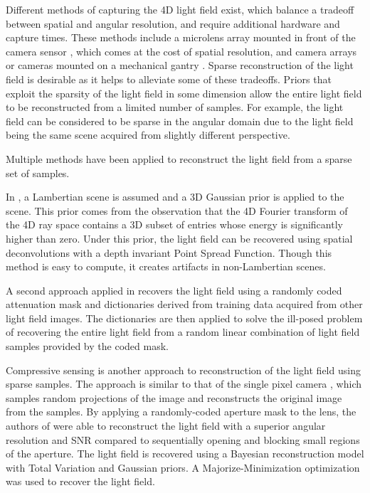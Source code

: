 \documentclass[10pt,twocolumn,letterpaper]{article}
\begin{document}
Different methods of capturing the 4D light field exist, which balance a tradeoff between spatial and angular resolution, and require additional hardware and capture times. These methods include a microlens array mounted in front of the camera sensor \cite{NgLF}, which comes at the cost of spatial resolution, and camera arrays \cite{LFArray} or cameras mounted on a mechanical gantry \cite{LFRendering}. Sparse reconstruction of the light field is desirable as it helps to alleviate some of these tradeoffs. Priors that exploit the sparsity of the light field in some dimension allow the entire light field to be reconstructed from a limited number of samples. For example, the light field can be considered to be sparse in the angular domain due to the light field being the same scene acquired from slightly different perspective. 

Multiple methods have been applied to reconstruct the light field from a sparse set of samples. 

In \cite{DimGapLFPrior}, a Lambertian scene is assumed and a 3D Gaussian prior is applied to the scene. This prior comes from the observation that the 4D Fourier transform of the 4D ray space contains a 3D subset of entries whose energy is significantly higher than zero. Under this prior, the light field can be recovered using spatial deconvolutions with a depth invariant Point Spread Function. Though this method is easy to compute, it creates artifacts in non-Lambertian scenes.

A second approach applied in \cite{LFDict} recovers the light field using a randomly coded attenuation mask and dictionaries derived from training data acquired from other light field images. The dictionaries are then applied to solve the ill-posed problem of recovering the entire light field from a random linear combination of light field samples provided by the coded mask.

Compressive sensing \cite{IntroCS}\cite{CompressiveSensingMega} is another approach to reconstruction of the light field using sparse samples. The approach is similar to that of the single pixel camera \cite{SinglePixelCamera}, which samples random projections of the image and reconstructs the original image from the samples. By applying a randomly-coded aperture mask to the lens, the authors of \cite{SparsityInCFD} were able to reconstruct the light field with a superior angular resolution and SNR compared to sequentially opening and blocking small regions of the aperture. The light field is recovered using a Bayesian reconstruction model with Total Variation and Gaussian priors. A Majorize-Minimization optimization was used to recover the light field.
\end{document}
